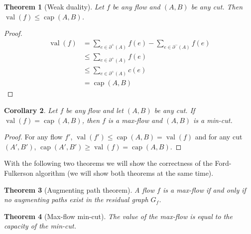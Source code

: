 \documentclass{tufte-handout}
\newtheorem{thm}{Theorem}
\newtheorem{cor}[thm]{Corollary}
\theoremstyle{definition}
\theoremstyle{remark}
\DeclareMathOperator{\val}{val}
\DeclareMathOperator{\capac}{cap}
\begin{document}
\begin{thm}[Weak duality]
	Let $f$ be any flow and $(A,B)$ be any cut. Then $\val(f) \leq \capac(A,B)$.
\end{thm}
\begin{proof}
	\begin{align*}
	\val(f) &= \sum_{e \in \partial^+(A)}f(e) - \sum_{e \in \partial^-(A)}f(e)\\
	&\leq \sum_{e \in \partial^+(A)}f(e)\\
	&\leq \sum_{e \in \partial^+(A)}c(e)\\
	&= \capac(A,B)
	\end{align*}
\end{proof}
\begin{cor}
	Let $f$ be any flow and let $(A,B)$ be any cut. If $\val(f) = \capac(A,B)$, then $f$ is a max-flow and $(A,B)$ is a min-cut.
\end{cor}
\begin{proof}
	For any flow $f'$, $\val(f') \leq \capac(A,B) = \val(f)$ and for any cut $(A',B')$, $\capac(A',B') \geq \val(f) = \capac(A,B)$.
\end{proof}
With the following two theorems we will show the correctness of the Ford-Fulkerson algorithm (we will show both theorems at the same time).
\begin{thm}[Augmenting path theorem]
	A flow $f$ is a max-flow if and only if no augmenting paths exist in the residual graph $G_f$.	
\end{thm}
\begin{thm}[Max-flow min-cut]
	The value of the max-flow is equal to the capacity of the min-cut.
\end{thm}
\end{document}
